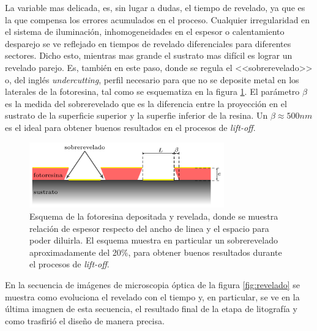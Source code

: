 { 		   La variable mas delicada, es, sin lugar a dudas, el tiempo de revelado, ya que es la que compensa los errores acumulados en el proceso. Cualquier irregularidad en el sistema de iluminación, inhomogeneidades en el espesor o calentamiento desparejo se ve reflejado en tiempos de revelado diferenciales para diferentes sectores. Dicho esto, mientras mas grande el sustrato mas difícil es lograr un revelado parejo. Es, también en este paso, donde se regula el <<sobrerevelado>> o, del inglés \textit{undercutting}, perfil necesario para que no se deposite metal en los laterales de la fotoresina, tal como se esquematiza en la figura \ref{fig:undercut}. El parámetro $\beta$ es la medida del sobrerevelado que es la diferencia entre la proyección en el sustrato de la superficie superior y la superfie inferior de la resina. Un $\beta \approx 500nm$ es el ideal para obtener buenos resultados en el procesos de \textit{lift-off}. 

 				\begin{figure}[ht!]
 				\centering
 				\includegraphics[width=0.75\textwidth]{Esquemas/altura-ancho.pdf}
 				\caption[Perfil de fotorresina para el decapado o\textit{ lift-off}]{Esquema de la fotoresina depositada y revelada, donde se muestra relación de espesor respecto del ancho de linea y el espacio para poder diluirla. El esquema muestra en particular un sobrerevelado aproximadamente del 20\%, para obtener buenos resultados durante el procesos de\textit{ lift-off}.}
 				\label{fig:undercut}
 				\end{figure}

 		    En la secuencia de imágenes de microscopia óptica de la figura \ref{fig:revelado} se muestra como evoluciona el revelado con el tiempo y, en particular, se ve en la última imagnen de esta secuencia, el resultado final de la etapa de litografía y como trasfirió el diseño de manera precisa.

}
